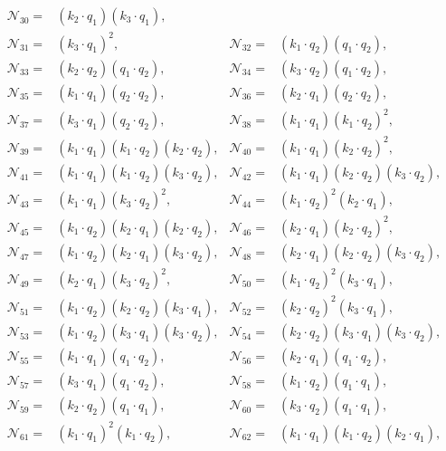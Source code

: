 \documentclass[twocolumn,aps,showpacs,nofootinbib,superscriptaddress,prd]{revtex4-2}
\begin{document}
\begin{widetext}
\begin{align}
{\mathcal N}_{30}=&(k_2\cdot q_1) (k_3\cdot q_1),\nonumber\\
{\mathcal N}_{31}=&(k_3\cdot q_1)^2,&
{\mathcal N}_{32}=&(k_1\cdot q_2) (q_1\cdot q_2),\nonumber\\
{\mathcal N}_{33}=&(k_2\cdot q_2) (q_1\cdot q_2),&
{\mathcal N}_{34}=&(k_3\cdot q_2) (q_1\cdot q_2),\nonumber\\
{\mathcal N}_{35}=&(k_1\cdot q_1) (q_2\cdot q_2),&
{\mathcal N}_{36}=&(k_2\cdot q_1) (q_2\cdot q_2),\nonumber\\
{\mathcal N}_{37}=&(k_3\cdot q_1) (q_2\cdot q_2),&
{\mathcal N}_{38}=&(k_1\cdot q_1) (k_1\cdot q_2)^2,\nonumber\\
{\mathcal N}_{39}=&(k_1\cdot q_1) (k_1\cdot q_2) (k_2\cdot q_2),&
{\mathcal N}_{40}=&(k_1\cdot q_1) (k_2\cdot q_2)^2,\nonumber\\
{\mathcal N}_{41}=&(k_1\cdot q_1) (k_1\cdot q_2) (k_3\cdot q_2),&
{\mathcal N}_{42}=&(k_1\cdot q_1) (k_2\cdot q_2) (k_3\cdot q_2),\nonumber\\
{\mathcal N}_{43}=&(k_1\cdot q_1) (k_3\cdot q_2)^2,&
{\mathcal N}_{44}=&(k_1\cdot q_2)^2 (k_2\cdot q_1),\nonumber\\
{\mathcal N}_{45}=&(k_1\cdot q_2) (k_2\cdot q_1) (k_2\cdot q_2),&
{\mathcal N}_{46}=&(k_2\cdot q_1) (k_2\cdot q_2)^2,\nonumber\\
{\mathcal N}_{47}=&(k_1\cdot q_2) (k_2\cdot q_1) (k_3\cdot q_2),&
{\mathcal N}_{48}=&(k_2\cdot q_1) (k_2\cdot q_2) (k_3\cdot q_2),\nonumber\\
{\mathcal N}_{49}=&(k_2\cdot q_1) (k_3\cdot q_2)^2,&
{\mathcal N}_{50}=&(k_1\cdot q_2)^2 (k_3\cdot q_1),\nonumber\\
{\mathcal N}_{51}=&(k_1\cdot q_2) (k_2\cdot q_2) (k_3\cdot q_1),&
{\mathcal N}_{52}=&(k_2\cdot q_2)^2 (k_3\cdot q_1),\nonumber\\
{\mathcal N}_{53}=&(k_1\cdot q_2) (k_3\cdot q_1) (k_3\cdot q_2),&
{\mathcal N}_{54}=&(k_2\cdot q_2) (k_3\cdot q_1) (k_3\cdot q_2),\nonumber\\
{\mathcal N}_{55}=&(k_1\cdot q_1) (q_1\cdot q_2),&
{\mathcal N}_{56}=&(k_2\cdot q_1) (q_1\cdot q_2),\nonumber\\
{\mathcal N}_{57}=&(k_3\cdot q_1) (q_1\cdot q_2),&
{\mathcal N}_{58}=&(k_1\cdot q_2) (q_1\cdot q_1),\nonumber\\
{\mathcal N}_{59}=&(k_2\cdot q_2) (q_1\cdot q_1),&
{\mathcal N}_{60}=&(k_3\cdot q_2) (q_1\cdot q_1),\nonumber\\
{\mathcal N}_{61}=&(k_1\cdot q_1)^2 (k_1\cdot q_2),&
{\mathcal N}_{62}=&(k_1\cdot q_1) (k_1\cdot q_2) (k_2\cdot q_1),\nonumber\\

\end{align}
\end{widetext}
\end{document}
